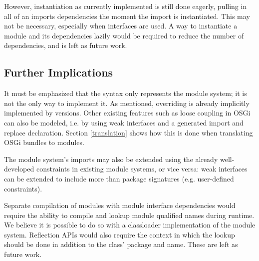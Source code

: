 However, instantiation as currently implemented is still done eagerly, pulling in all
of an imports dependencies the moment the import is instantiated. This may not be necessary,
especially when interfaces are used. A way to instantiate a module and its dependencies 
lazily would be required to reduce the number of dependencies, and is left as future work.

\subsection{Further Implications}

It must be emphasized that the syntax only represents the module system; it is not the only way
to implement it. As mentioned, overriding is already implicitly implemented
by versions. Other existing features such as loose coupling in OSGi can
also be modeled, i.e. by using weak interfaces and a generated import and replace
declaration. Section \ref{translation} shows how this is done when translating OSGi bundles to modules.

The module system's imports may also be extended using the already well-developed
constraints in existing module systems, or vice versa: weak interfaces can be extended
to include more than package signatures (e.g. user-defined constraints). 

Separate compilation of modules with module interface dependencies would require
the ability to compile and lookup module qualified names during runtime. We believe
it is possible to do so with a classloader implementation of the module system. Reflection
APIs would also require the context in which the lookup should be done in addition to
the class' package and name. These are left as future work.

